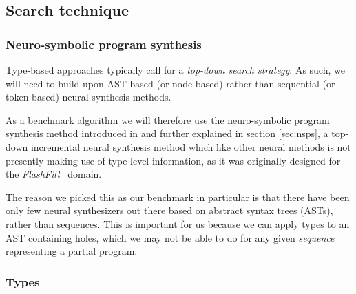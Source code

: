 \documentclass{article}
\begin{document}
\subsection{Search technique}

\subsubsection{Neuro-symbolic program synthesis}

Type-based approaches typically call for a \emph{top-down search strategy}.
As such, we will need to build upon AST-based (or node-based) rather than sequential (or token-based) neural synthesis methods.

As a benchmark algorithm we will therefore use the neuro-symbolic program synthesis method introduced in \citet{nsps} and further explained in section \ref{sec:nsps},
a top-down incremental neural synthesis method which like other neural methods is not presently making use of type-level information,
as it was originally designed for the \emph{FlashFill}~\citep{prose} domain.

The reason we picked this as our benchmark in particular is that there have been only few neural synthesizers out there based on abstract syntax trees (ASTs), rather than sequences.
This is important for us because we can apply types to an AST containing holes,
which we may not be able to do for any given \emph{sequence} representing a partial program.

\subsubsection{Types}

\end{document}
